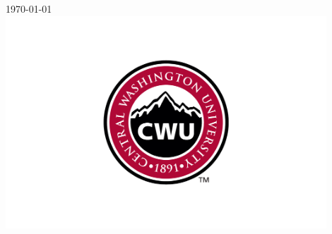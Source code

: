 \documentclass[12pt]{article}
\begin{document}
\begin{titlepage}
		
		
		{\large \today}\\ %
		
		
		\includegraphics[width=12cm]{CWU-Logo.png}\\[.5cm] %
		
		
		\vfill %
		
	\end{titlepage}
	\newpage
	\tableofcontents
	\newpage
	
	
	
\end{document}
